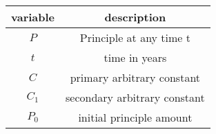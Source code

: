 \begin{tabular}[12pt]{|c|c|}
     \hline
     {variable} & {description}\\
     \hline
     $P$ & Principle at any time t\\
     \hline
     $t$ & time in years\\
     \hline
     $C$ & primary arbitrary constant\\
     \hline
     $C_1$ & secondary arbitrary constant\\
     \hline
     $P_0$ & initial principle amount\\
     \hline
     
\end{tabular}
